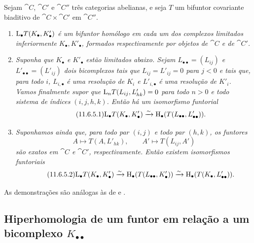 \begin{proposition}[11.6.5]
\label{0.11.6.5}
Sejam $\cat{C}$, $\cat{C}'$ e $\cat{C}''$ três categorias abelianas, e seja $T$ um bifuntor covariante biaditivo de $\cat{C}\times\cat{C}'$ em $\cat{C}''$.
\begin{enumerate}
  \item[{\rm(i) }] \emph{$\mathrm{L}_\bullet T(K_\bullet,K'_\bullet)$ é um bifuntor homólogo em cada um dos complexos limitados inferiormente $K_\bullet,K'_\bullet$, formados respectivamente por objetos de $\cat{C}$ e de $\cat{C}'$.}

  \item[{\rm(ii) }] \emph{Suponha que $K_\bullet$ e $K'_\bullet$ estão limitados abaixo.
  Sejam $L_{\bullet\bullet}=(L_{ij})$ e $L'_{\bullet\bullet}=(L'_{ij})$ dois bicomplexos tais que $L_{ij}=L'_{ij}=0$ para $j<0$ e tais que, para todo $i$, $L_{i,\bullet}$ é uma resolução de $K_i$ e $L'_{i,\bullet}$ é uma resolução de $K'_i$.
  Vamos finalmente supor que $\mathrm{L}_nT(L_{ij},L'_{hk})=0$ para todo $n>0$ e todo sistema de índices $(i,j,h,k)$.
  Então há um isomorfismo funtorial}
  \[
  \label{0.11.6.5.1}
  \tag{11.6.5.1}
    \LL_\bullet T(K_\bullet,K'_\bullet)
    \simto
    \HH_\bullet(T(L_{\bullet\bullet},L'_{\bullet\bullet})).
  \]

  \item[{\rm(iii) }] \emph{Suponhamos ainda que, para todo par $(i,j)$ e todo par $(h,k)$, os funtores
  \[
    A\longmapsto T(A,L'_{hk}),
    \qquad
    A'\longmapsto T(L_{ij},A')
  \]
  são exatos em $\cat{C}$ e $\cat{C}'$, respectivamente.
  Então existem isomorfismos funtoriais}
  \[
  \label{0.11.6.5.2}
  \tag{11.6.5.2}
    \LL_\bullet T(K_\bullet,K'_\bullet)
    \simto
    \HH_\bullet(T(L_{\bullet\bullet},K'_\bullet))
    \simto
    \HH_\bullet(T(K_\bullet,L'_{\bullet\bullet})).
  \]
\end{enumerate}

As demonstrações são análogas às de  e .
\end{proposition}

\subsection{Hiperhomologia de um funtor em relação a um bicomplexo $K_{\bullet\bullet}$}
\label{subsection:0.11.7}

